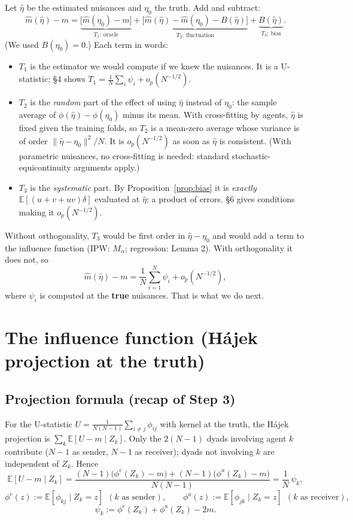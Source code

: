 \documentclass[11pt,a4paper]{article}
\theoremstyle{remark}
\newcommand{\E}{\mathbb{E}}
\newcommand{\1}{\mathbf{1}}
\begin{document}
Let $\hat\eta$ be the estimated nuisances and $\eta_0$ the truth. Add and subtract:
\[
\hat m(\hat\eta)-m
=\underbrace{\big[\hat m(\eta_0)-m\big]}_{T_1:\ \text{oracle}}
+\underbrace{\big[\hat m(\hat\eta)-\hat m(\eta_0)-B(\hat\eta)\big]}_{T_2:\ \text{fluctuation}}
+\underbrace{B(\hat\eta)}_{T_3:\ \text{bias}}.
\]
(We used $B(\eta_0)=0$.) Each term in words:
\begin{itemize}[leftmargin=*]
  \item $T_1$ is the estimator we would compute if we knew the nuisances. It is a U-statistic; \S4 shows $T_1=\frac1N\sum_i\psi_i+o_p(N^{-1/2})$.
  \item $T_2$ is the \emph{random} part of the effect of using $\hat\eta$ instead of $\eta_0$: the sample average of $\phi(\hat\eta)-\phi(\eta_0)$ minus its mean. With cross-fitting by agents, $\hat\eta$ is fixed given the training folds, so $T_2$ is a mean-zero average whose variance is of order $\|\hat\eta-\eta_0\|^2/N$. It is $o_p(N^{-1/2})$ as soon as $\hat\eta$ is consistent. (With parametric nuisances, no cross-fitting is needed: standard stochastic-equicontinuity arguments apply.)
  \item $T_3$ is the \emph{systematic} part. By Proposition~\ref{prop:bias} it is \emph{exactly} $\E[(u+v+uv)\delta]$ evaluated at $\hat\eta$: a product of errors. \S6 gives conditions making it $o_p(N^{-1/2})$.
\end{itemize}
Without orthogonality, $T_3$ would be first order in $\hat\eta-\eta_0$ and would add a term to the influence function (IPW: $M_\alpha$; regression: Lemma 2). With orthogonality it does not, so
\[
\hat m(\hat\eta)-m=\frac1N\sum_{i=1}^N\psi_i+o_p(N^{-1/2}),
\]
where $\psi_i$ is computed at the \textbf{true} nuisances. That is what we do next.

\section{The influence function (Hájek projection at the truth)}

\subsection{Projection formula (recap of Step 3)}
For the U-statistic $U=\frac{1}{N(N-1)}\sum_{i\neq j}\phi_{ij}$ with kernel at the truth, the Hájek projection is $\sum_k\E[U-m\mid Z_k]$. Only the $2(N-1)$ dyads involving agent $k$ contribute ($N-1$ as sender, $N-1$ as receiver); dyads not involving $k$ are independent of $Z_k$. Hence
\[
\E[U-m\mid Z_k]=\frac{(N-1)\big(\phi^{e}(Z_k)-m\big)+(N-1)\big(\phi^{a}(Z_k)-m\big)}{N(N-1)}=\frac1N\,\psi_k,
\]
\[
\phi^{e}(z):=\E[\phi_{kj}\mid Z_k=z]\ \ (k\text{ as sender}),\qquad
\phi^{a}(z):=\E[\phi_{jk}\mid Z_k=z]\ \ (k\text{ as receiver}),
\]
\[
\psi_k:=\phi^e(Z_k)+\phi^a(Z_k)-2m.
\]
\end{document}
